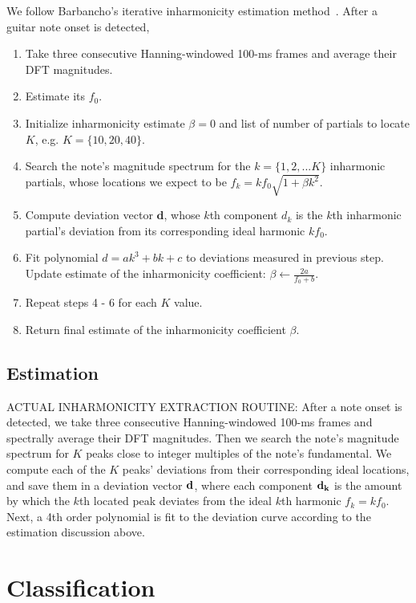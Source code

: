 \documentclass[12pt]{cmuthesis}
\begin{document}
We follow Barbancho's iterative inharmonicity estimation method~\cite{barbanchoi2012}. After a guitar note onset is detected,
\begin{enumerate}
\item Take three consecutive Hanning-windowed 100-ms frames and average their DFT magnitudes.
\item Estimate its $f_0$. 
\item Initialize inharmonicity estimate $\beta = 0$ and list of number of partials to locate $K$, e.g. $K = \{10, 20, 40\}$.
\item Search the note's magnitude spectrum for the $k = \{1, 2,...K\}$ inharmonic partials, whose locations we expect to be $f_{k} = kf_{0}\sqrt{1+\beta k^{2}}$.
\item Compute deviation vector $\mathbf{d}$, whose $k$th component $d_k$ is the $k$th inharmonic partial's deviation from its corresponding ideal harmonic $kf_0$.
\item Fit polynomial $d = ak^3 + bk + c$ to deviations measured in previous step. Update estimate of the inharmonicity coefficient: $\beta \longleftarrow \frac{2a}{f_0+b}$.
\item Repeat steps 4 - 6 for each $K$ value.
\item Return final estimate of the inharmonicity coefficient $\beta$.
\end{enumerate}

\subsection{Estimation}
 ACTUAL INHARMONICITY EXTRACTION ROUTINE: After a note onset is detected, we take three consecutive Hanning-windowed 100-ms frames and spectrally average their DFT magnitudes. Then we search the note's magnitude spectrum for $K$ peaks close to integer multiples of the note's fundamental. We compute each of the $K$ peaks' deviations from their corresponding ideal locations, and save them in a deviation vector $\bf{d}$, where each component $\bf{d_{k}}$ is the amount by which the $k$th located peak deviates from the ideal $k$th harmonic $f_k = kf_0$. Next, a 4th order polynomial is fit to the deviation curve according to the estimation discussion above.





\section{Classification}
\end{document}
